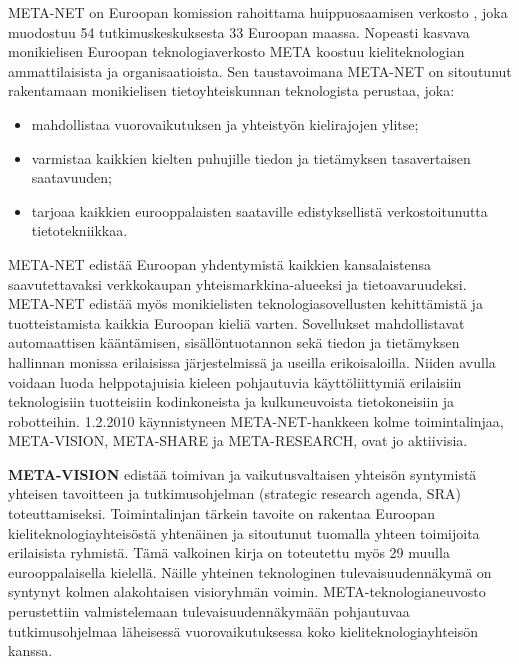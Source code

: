 \cleardoublepage
\begin{multicols}{2}

META-NET on Euroopan komission rahoittama huippuosaamisen verkosto \cite{rehm2011}, joka muodostuu 54 tutkimuskeskuksesta 33 Euroopan maassa. Nopeasti kasvava monikielisen Euroopan teknologiaverkosto META koostuu kieliteknologian ammattilaisista ja organisaatioista. Sen taustavoimana META-NET on sitoutunut rakentamaan monikielisen tietoyhteiskunnan teknologista perustaa, joka:
\begin{itemize}
\item mahdollistaa vuorovaikutuksen ja yhteistyön kielirajojen ylitse;
\item varmistaa kaikkien kielten puhujille tiedon ja tietämyksen tasavertaisen saatavuuden;
\item tarjoaa kaikkien eurooppalaisten saataville edistyksellistä verkostoitunutta tietotekniikkaa.
\end{itemize}

META-NET edistää Euroopan yhdentymistä kaikkien kansalaistensa saavutettavaksi verkkokaupan yhteismarkkina-alueeksi ja tietoavaruudeksi. META-NET edistää myös monikielisten teknologiasovellusten kehittämistä ja tuotteistamista kaikkia Euroopan kieliä varten. Sovellukset mahdollistavat automaattisen kääntämisen, sisällöntuotannon sekä tiedon ja tietämyksen hallinnan monissa erilaisissa järjestelmissä ja useilla erikoisaloilla. Niiden avulla voidaan luoda helppotajuisia kieleen pohjautuvia käyttöliittymiä erilaisiin teknologisiin tuotteisiin kodinkoneista ja kulkuneuvoista tietokoneisiin ja robotteihin. 
1.2.2010 käynnistyneen META-NET-hankkeen kolme toimintalinjaa, META-VISION, META-SHARE ja META-RESEARCH, ovat jo aktiivisia.

\textbf{META-VISION} edistää toimivan ja vaikutusvaltaisen yhteisön syntymistä yhteisen tavoitteen ja tutkimusohjelman (strategic research agenda, SRA) toteuttamiseksi. Toimintalinjan tärkein tavoite on rakentaa Euroopan kieliteknologiayhteisöstä yhtenäinen ja sitoutunut tuomalla yhteen toimijoita erilaisista ryhmistä. Tämä valkoinen kirja on toteutettu myös 29 muulla eurooppalaisella kielellä. Näille yhteinen teknologinen tulevaisuudennäkymä on syntynyt kolmen alakohtaisen visioryhmän voimin. META-teknologianeuvosto perustettiin valmistelemaan tulevaisuudennäkymään pohjautuvaa tutkimusohjelmaa läheisessä vuorovaikutuksessa koko kieliteknologiayhteisön kanssa.


\end{multicols}
